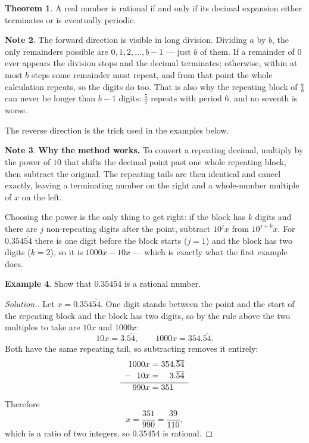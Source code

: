 \documentclass[11pt,a4paper]{article}
\theoremstyle{definition}
\newtheorem{thm}{Theorem}[section]
\newtheorem{example}[thm]{Example}
\newtheorem{note}[thm]{Note}
\newenvironment{solution}
  {\renewcommand{\qedsymbol}{}\begin{proof}[\textit{Solution}.]}
  {\end{proof}}
\begin{document}
\begin{thm}
A real number is rational if and only if its decimal expansion either terminates
or is eventually periodic.
\end{thm}

\begin{note}
The forward direction is visible in long division. Dividing $a$ by $b$, the only
remainders possible are $0,1,2,\dots,b-1$ --- just $b$ of them. If a remainder of
$0$ ever appears the division stops and the decimal terminates; otherwise, within
at most $b$ steps some remainder must repeat, and from that point the whole
calculation repeats, so the digits do too. That is also why the repeating block of
$\frac{a}{b}$ can never be longer than $b-1$ digits: $\frac{5}{7}$ repeats with
period $6$, and no seventh is worse.

The reverse direction is the trick used in the examples below.
\end{note}

\begin{note}
\textbf{Why the method works.} To convert a repeating decimal, multiply by the
power of $10$ that shifts the decimal point past one whole repeating block, then
subtract the original. The repeating tails are then identical and cancel exactly,
leaving a terminating number on the right and a whole-number multiple of $x$ on
the left.

Choosing the power is the only thing to get right: if the block has $k$ digits and
there are $j$ non-repeating digits after the point, subtract $10^{j}x$ from
$10^{j+k}x$. For $0.354\overline{54}$ there is one digit before the block starts
($j=1$) and the block has two digits ($k=2$), so it is $1000x-10x$ --- which is
exactly what the first example does.
\end{note}


\begin{example}
Show that $0.354\overline{54}$ is a rational number.
\end{example}

\begin{solution}
Let $x=0.354\overline{54}$. One digit stands between the point and the start of
the repeating block and the block has two digits, so by the rule above the two
multiples to take are $10x$ and $1000x$:
$$10x=3.\overline{54},\qquad 1000x=354.\overline{54}.$$
Both have the same repeating tail, so subtracting removes it entirely:
$$\begin{array}{r@{\;}c@{\;}l}
1000x & = & 354.\overline{54}\\[2pt]
-\ \ 10x & = & \phantom{00}3.\overline{54}\\[2pt]
\hline
990x & = & 351
\end{array}$$
Therefore
$$x=\frac{351}{990}=\frac{39}{110},$$
which is a ratio of two integers, so $0.354\overline{54}$ is rational.
\end{solution}
\end{document}
